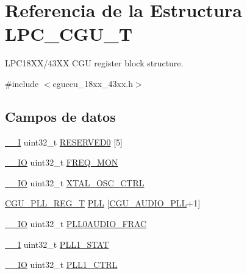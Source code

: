 \hypertarget{struct_l_p_c___c_g_u___t}{}\section{Referencia de la Estructura L\+P\+C\+\_\+\+C\+G\+U\+\_\+T}
\label{struct_l_p_c___c_g_u___t}


L\+P\+C18\+X\+X/43\+XX C\+GU register block structure.  




{\ttfamily \#include $<$cguccu\+\_\+18xx\+\_\+43xx.\+h$>$}

\subsection*{Campos de datos}
\begin{DoxyCompactItemize}
\item 
\hyperlink{core__sc300_8h_af63697ed9952cc71e1225efe205f6cd3}{\+\_\+\+\_\+I} uint32\+\_\+t \hyperlink{struct_l_p_c___c_g_u___t_abcea022b884a52d0aa9657e2cdd15ce1}{R\+E\+S\+E\+R\+V\+E\+D0} \mbox{[}5\mbox{]}
\item 
\hyperlink{core__sc300_8h_aec43007d9998a0a0e01faede4133d6be}{\+\_\+\+\_\+\+IO} uint32\+\_\+t \hyperlink{struct_l_p_c___c_g_u___t_a70422101884eff914ae3c57b819aa49f}{F\+R\+E\+Q\+\_\+\+M\+ON}
\item 
\hyperlink{core__sc300_8h_aec43007d9998a0a0e01faede4133d6be}{\+\_\+\+\_\+\+IO} uint32\+\_\+t \hyperlink{struct_l_p_c___c_g_u___t_a08fa4263afc50502f29cf2659239b808}{X\+T\+A\+L\+\_\+\+O\+S\+C\+\_\+\+C\+T\+RL}
\item 
\hyperlink{struct_c_g_u___p_l_l___r_e_g___t}{C\+G\+U\+\_\+\+P\+L\+L\+\_\+\+R\+E\+G\+\_\+T} \hyperlink{struct_l_p_c___c_g_u___t_aad5b65eccb2424bc90575cafe7d38d29}{P\+LL} \mbox{[}\hyperlink{group___c_l_o_c_k__18_x_x__43_x_x_ggabdd04536f16b3c7b588757d024e53da6a417d44002637aeeb1b62b42c39723cc1}{C\+G\+U\+\_\+\+A\+U\+D\+I\+O\+\_\+\+P\+LL}+1\mbox{]}
\item 
\hyperlink{core__sc300_8h_aec43007d9998a0a0e01faede4133d6be}{\+\_\+\+\_\+\+IO} uint32\+\_\+t \hyperlink{struct_l_p_c___c_g_u___t_ae4d55c3e2485ac46e29efffa250d1fb1}{P\+L\+L0\+A\+U\+D\+I\+O\+\_\+\+F\+R\+AC}
\item 
\hyperlink{core__sc300_8h_af63697ed9952cc71e1225efe205f6cd3}{\+\_\+\+\_\+I} uint32\+\_\+t \hyperlink{struct_l_p_c___c_g_u___t_a2142c26f9eba82a8d115d2ab457f2287}{P\+L\+L1\+\_\+\+S\+T\+AT}
\item 
\hyperlink{core__sc300_8h_aec43007d9998a0a0e01faede4133d6be}{\+\_\+\+\_\+\+IO} uint32\+\_\+t \hyperlink{struct_l_p_c___c_g_u___t_a511841aab4fd9006722c9a4130315614}{P\+L\+L1\+\_\+\+C\+T\+RL}

\end{DoxyCompactItemize}
